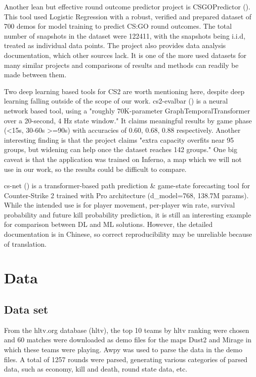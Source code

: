 \documentclass[twoside,11pt]{article}
\begin{document}
Another lean but effective round outcome predictor project is CSGOPredictor (\cite{csgopredictor}).
This tool used Logistic Regression with a robust, verified and prepared dataset of 700 demos for
model training to predict CS:GO round outcomes. The total number of snapshots in the dataset were
122411, with the snapshots being i.i.d, treated as individual data points. The project also provides
data analysis documentation, which other sources lack. It is one of the more used datasets for many
similar projects and comparisons of results and methods can readily be made between them.

Two deep learning based tools for CS2 are worth mentioning here, despite deep learning falling
outside of the scope of our work. cs2-evalbar (\cite{cs2evalbar}) is a neural network based tool,
using a "roughly 70K-parameter GraphTemporalTransformer over a 20-second, 4 Hz state window." It
claims meaningful results by game phase (<15s, 30-60s >=90s) with accuracies of 0.60, 0.68, 0.88
respectively. Another interesting finding is that the project claims "extra capacity overfits near
95 groups, but widening can help once the dataset reaches 142 groups." One big caveat is that the
application was trained on Inferno, a map which we will not use in our work, so the results could be
difficult to compare.

cs-net (\cite{csnet}) is a transformer-based path prediction \& game-state forecasting tool for
Counter-Strike 2 trained with Pro architecture (d\_model=768, 138.7M params). While the intended use
is for player movement, per-player win rate, survival probability and future kill probability
prediction, it is still an interesting example for comparison between DL and ML solutions. However,
the detailed documentation is in Chinese, so correct reproducibility may be unreliable because of
translation.

\section{Data}

\subsection{Data set}

From the hltv.org database (hltv), the top 10 teams by hltv ranking were chosen and 60 matches were
downloaded as demo files for the maps Dust2 and Mirage in which these teams were playing. Awpy was
used to parse the data in the demo files. A total of 1257 rounds were parsed, generating various
categories of parsed data, such as economy, kill and death, round state data, etc.
\end{document}
